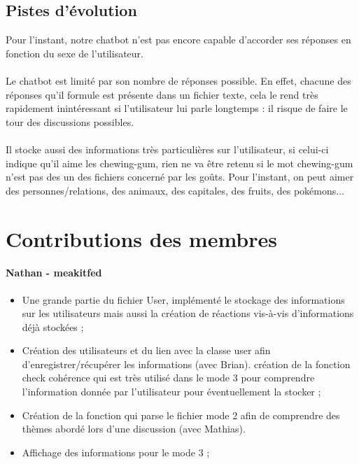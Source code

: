 \documentclass[paper=a4, fontsize=11pt]{article}
\begin{document}
\subsection{Pistes d'évolution}

Pour l'instant, notre chatbot n'est pas encore capable d'accorder ses réponses en fonction du sexe de l'utilisateur.
\paragraph{} Le chatbot est limité par son nombre de réponses possible. En effet, chacune des réponses qu’il formule est présente dans un fichier texte, cela le rend très rapidement inintéressant si l’utilisateur lui parle longtemps : il risque de faire le tour des discussions possibles. 
\paragraph{} Il stocke aussi des informations très particulières sur l’utilisateur, si celui-ci indique qu’il aime les chewing-gum, rien ne va être retenu si le mot chewing-gum n’est pas des un des fichiers concerné par les goûts. Pour l’instant, on peut aimer des personnes/relations, des animaux, des capitales, des fruits, des pokémons...

\vspace{0.5cm}

\section{Contributions des membres}

\paragraph{Nathan - meakitfed}
\begin{itemize}
\item Une grande partie du fichier User, implémenté le stockage des informations sur les utilisateurs mais aussi la création de réactions vis-à-vis d'informations déjà stockées ;
\item Création des utilisateurs et du lien avec la classe user afin d’enregistrer/récupérer les informations (avec Brian).
création de la fonction check cohérence qui est très utilisé dans le mode 3 pour comprendre l’information donnée par l’utilisateur pour éventuellement la stocker ;
\item Création de la fonction qui parse le fichier mode 2 afin de comprendre des thèmes abordé lors d’une discussion (avec Mathias).
\item Affichage des informations pour le mode 3 ;
\end{itemize}
\end{document}
